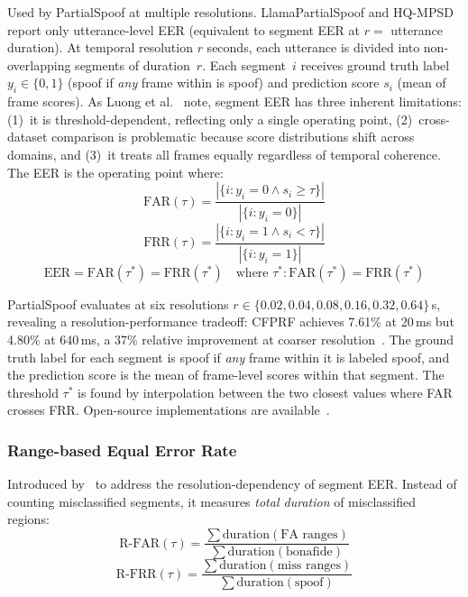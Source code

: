 \documentclass[journal]{IEEEtran}
\begin{document}
Used by PartialSpoof at multiple resolutions. LlamaPartialSpoof and HQ-MPSD report only utterance-level EER (equivalent to segment EER at $r =$ utterance duration). At temporal resolution $r$ seconds, each utterance is divided into non-overlapping segments of duration~$r$. Each segment~$i$ receives ground truth label $y_i \in \{0,1\}$ (spoof if \emph{any} frame within is spoof) and prediction score $s_i$ (mean of frame scores). As Luong et al.~\cite{luong2025metrics} note, segment EER has three inherent limitations: (1)~it is threshold-dependent, reflecting only a single operating point, (2)~cross-dataset comparison is problematic because score distributions shift across domains, and (3)~it treats all frames equally regardless of temporal coherence. The EER is the operating point where:
\begin{equation}
\label{eq:far}
\text{FAR}(\tau) = \frac{|\{i : y_i = 0 \wedge s_i \geq \tau\}|}{|\{i : y_i = 0\}|}
\end{equation}
\begin{equation}
\label{eq:frr}
\text{FRR}(\tau) = \frac{|\{i : y_i = 1 \wedge s_i < \tau\}|}{|\{i : y_i = 1\}|}
\end{equation}
\begin{equation}
\label{eq:eer}
\text{EER} = \text{FAR}(\tau^*) = \text{FRR}(\tau^*) \quad \text{where } \tau^* : \text{FAR}(\tau^*) = \text{FRR}(\tau^*)
\end{equation}

PartialSpoof evaluates at six resolutions $r \in \{0.02, 0.04, 0.08, 0.16, 0.32, 0.64\}$\,s, revealing a resolution-performance tradeoff: CFPRF achieves 7.61\% at 20\,ms but 4.80\% at 640\,ms, a 37\% relative improvement at coarser resolution~\cite{luong2025metrics}. The ground truth label for each segment is spoof if \emph{any} frame within it is labeled spoof, and the prediction score is the mean of frame-level scores within that segment. The threshold $\tau^*$ is found by interpolation between the two closest values where FAR crosses FRR. Open-source implementations are available~\cite{hieuthi_partialspoof_metrics}.

\subsubsection{Range-based Equal Error Rate}

Introduced by~\cite{zhang2023rangeeer} to address the resolution-dependency of segment EER. Instead of counting misclassified segments, it measures \emph{total duration} of misclassified regions:
\begin{equation}
\label{eq:rfar}
\text{R-FAR}(\tau) = \frac{\sum \text{duration}(\text{FA ranges})}{\sum \text{duration}(\text{bonafide})}
\end{equation}
\begin{equation}
\label{eq:rfrr}
\text{R-FRR}(\tau) = \frac{\sum \text{duration}(\text{miss ranges})}{\sum \text{duration}(\text{spoof})}
\end{equation}
\end{document}
